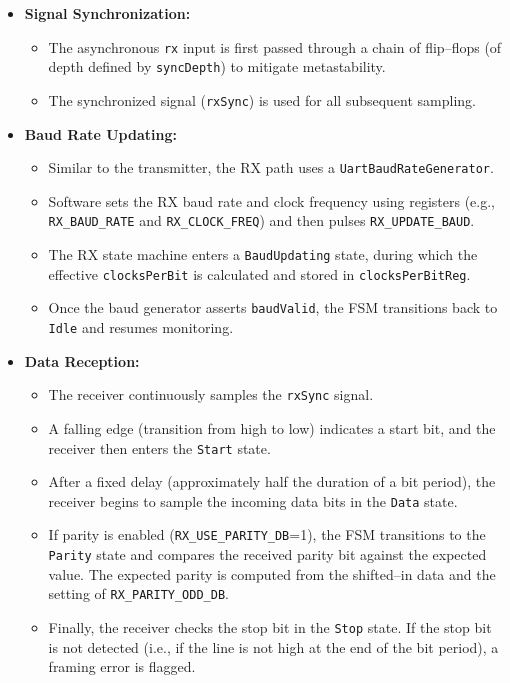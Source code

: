 \begin{itemize}
    \item \textbf{Signal Synchronization:}
    \begin{itemize}
        \item The asynchronous \texttt{rx} input is first passed through a chain of flip–flops (of depth defined by \texttt{syncDepth}) to mitigate metastability.
        \item The synchronized signal (\texttt{rxSync}) is used for all subsequent sampling.
    \end{itemize}
    
    \item \textbf{Baud Rate Updating:}
    \begin{itemize}
        \item Similar to the transmitter, the RX path uses a \texttt{UartBaudRateGenerator}.
        \item Software sets the RX baud rate and clock frequency using registers (e.g., \texttt{RX\_BAUD\_RATE} and \texttt{RX\_CLOCK\_FREQ}) and then pulses \texttt{RX\_UPDATE\_BAUD}.
        \item The RX state machine enters a \texttt{BaudUpdating} state, during which the effective \texttt{clocksPerBit} is calculated and stored in \texttt{clocksPerBitReg}.
        \item Once the baud generator asserts \texttt{baudValid}, the FSM transitions back to \texttt{Idle} and resumes monitoring.
    \end{itemize}
    
    \item \textbf{Data Reception:}
    \begin{itemize}
        \item The receiver continuously samples the \texttt{rxSync} signal.
        \item A falling edge (transition from high to low) indicates a start bit, and the receiver then enters the \texttt{Start} state.
        \item After a fixed delay (approximately half the duration of a bit period), the receiver begins to sample the incoming data bits in the \texttt{Data} state.
        \item If parity is enabled (\texttt{RX\_USE\_PARITY\_DB}=1), the FSM transitions to the \texttt{Parity} state and compares the received parity bit against the expected value. The expected parity is computed from the shifted–in data and the setting of \texttt{RX\_PARITY\_ODD\_DB}.
        \item Finally, the receiver checks the stop bit in the \texttt{Stop} state. If the stop bit is not detected (i.e., if the line is not high at the end of the bit period), a framing error is flagged.
    \end{itemize}
    

\end{itemize}
